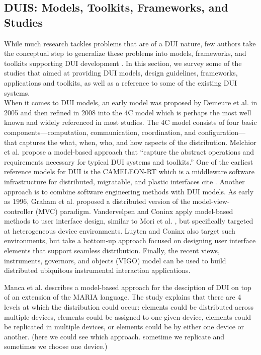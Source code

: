 \subsection{DUIS: Models, Toolkits, Frameworks, and Studies}
While much research tackles problems that are of a DUI nature, few authors take
the conceptual step to generalize these problems into models, frameworks, and
toolkits supporting DUI development \cite{elmqvist2011distributed}. In this
section, we survey some of the studies that aimed at providing DUI models,
design guidelines, frameworks, applications and toolkits, as well as a reference
to some of the existing DUI systems.\\

When it comes to DUI models, an early model was proposed by Demeure et al. in
2005 and then refined in 2008 \cite{demeure20084c} into the 4C model which is
perhaps the most well known and widely
referenced in most studies. The 4C model consists of four basic
components—computation, communication, coordination, and configuration—that captures the what, when, who, and how aspects of the distribution. Melchior et al. \cite{melchior2011distributed} propose a model-based approach that ``capture the abstract operations and
requirements necessary for typical DUI systems and toolkits.'' One of the
earliest reference models for DUI is the CAMELEON-RT \cite{coutaz2003software} which is a
middleware software infrastructure for distributed, migratable, and plastic
interfaces cite \cite{balme2004cameleon}.
Another approach is to combine software engineering methods with DUI models. As
early as 1996, Graham et al. \cite{graham1996efficient} proposed a distributed version of the
model-view-controller (MVC) paradigm. Vandervelpen and Coninx
\cite{vandervelpen2004towards} apply model-based methods to user interface
design, similar to Mori et al. \cite{mori2004design}, but specifically targeted
at heterogeneous device environments. Luyten and Coninx \cite{luyten2006designing} also target
such environments, but take a bottom-up approach focused on designing user
interface elements that support seamless distribution. Finally, the recent
views, instruments, governors, and objects (VIGO) model \cite{klokmose2009vigo} can be used
to build distributed ubiquitous instrumental interaction applications.

Manca et al. \cite{manca2011distributing} describes a model-based approach for
the desciption of DUI on top of an extension of the MARIA language. The study explains that
there are 4 levels at which the distribution could occur: elements could be
distributed across multiple devices, elements could be assigned to one given
device, elements could be replicated in multiple devices, or elements could be
by either one device or another. (here we could see which approach. sometime we
replicate and sometimes we choose one device.)\\

